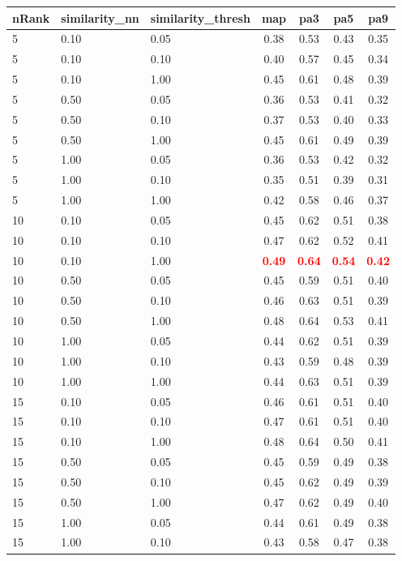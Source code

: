 \begin{tabular}{lllcccc} 
nRank & similarity\_nn & similarity\_thresh & map & pa3 & pa5 & pa9 \\ 
\hline 
 5 & 0.10 & 0.05 & 0.38 & 0.53 & 0.43 & 0.35 \\ 
 5 & 0.10 & 0.10 & 0.40 & 0.57 & 0.45 & 0.34 \\ 
 5 & 0.10 & 1.00 & 0.45 & 0.61 & 0.48 & 0.39 \\ 
 5 & 0.50 & 0.05 & 0.36 & 0.53 & 0.41 & 0.32 \\ 
 5 & 0.50 & 0.10 & 0.37 & 0.53 & 0.40 & 0.33 \\ 
 5 & 0.50 & 1.00 & 0.45 & 0.61 & 0.49 & 0.39 \\ 
 5 & 1.00 & 0.05 & 0.36 & 0.53 & 0.42 & 0.32 \\ 
 5 & 1.00 & 0.10 & 0.35 & 0.51 & 0.39 & 0.31 \\ 
 5 & 1.00 & 1.00 & 0.42 & 0.58 & 0.46 & 0.37 \\ 
10 & 0.10 & 0.05 & 0.45 & 0.62 & 0.51 & 0.38 \\ 
10 & 0.10 & 0.10 & 0.47 & 0.62 & 0.52 & 0.41 \\ 
10 & 0.10 & 1.00 & \textbf{\textcolor{red}{0.49}} & \textbf{\textcolor{red}{0.64}} & \textbf{\textcolor{red}{0.54}} & \textbf{\textcolor{red}{0.42}} \\ 
10 & 0.50 & 0.05 & 0.45 & 0.59 & 0.51 & 0.40 \\ 
10 & 0.50 & 0.10 & 0.46 & 0.63 & 0.51 & 0.39 \\ 
10 & 0.50 & 1.00 & 0.48 & 0.64 & 0.53 & 0.41 \\ 
10 & 1.00 & 0.05 & 0.44 & 0.62 & 0.51 & 0.39 \\ 
10 & 1.00 & 0.10 & 0.43 & 0.59 & 0.48 & 0.39 \\ 
10 & 1.00 & 1.00 & 0.44 & 0.63 & 0.51 & 0.39 \\ 
15 & 0.10 & 0.05 & 0.46 & 0.61 & 0.51 & 0.40 \\ 
15 & 0.10 & 0.10 & 0.47 & 0.61 & 0.51 & 0.40 \\ 
15 & 0.10 & 1.00 & 0.48 & 0.64 & 0.50 & 0.41 \\ 
15 & 0.50 & 0.05 & 0.45 & 0.59 & 0.49 & 0.38 \\ 
15 & 0.50 & 0.10 & 0.45 & 0.62 & 0.49 & 0.39 \\ 
15 & 0.50 & 1.00 & 0.47 & 0.62 & 0.49 & 0.40 \\ 
15 & 1.00 & 0.05 & 0.44 & 0.61 & 0.49 & 0.38 \\ 
15 & 1.00 & 0.10 & 0.43 & 0.58 & 0.47 & 0.38 \\ 

\end{tabular}
